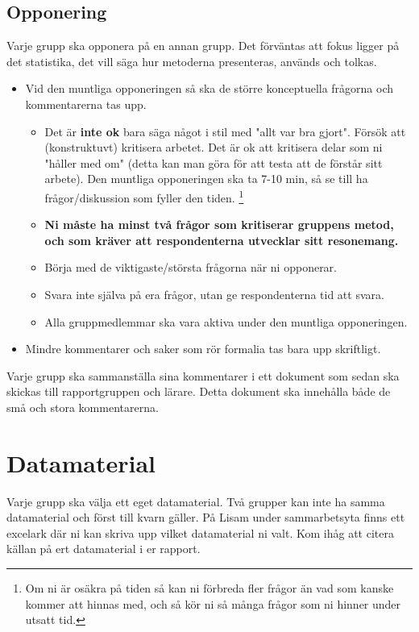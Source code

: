 \documentclass[a4paper]{article}
\begin{document}
\subsection*{Opponering}
Varje grupp ska opponera på en annan grupp. Det förväntas att fokus ligger på det statistika, det vill säga hur metoderna presenteras, används och tolkas.
\begin{itemize}
    \item Vid den muntliga opponeringen så ska de större konceptuella frågorna och kommentarerna tas upp.
    \begin{itemize}
      \item Det är \textbf{inte ok} bara säga något i stil med "allt var bra gjort". 
      Försök att (konstruktuvt) kritisera arbetet. Det är ok att kritisera delar som ni "håller med om" (detta kan man göra för att testa att de förstår sitt arbete).
      Den muntliga opponeringen ska ta 7-10 min, så se till ha frågor/diskussion som fyller den tiden.
      \footnote{Om ni är osäkra på tiden så kan ni förbreda fler frågor än vad som kanske
      kommer att hinnas med, och så kör ni så många frågor som ni hinner under utsatt tid.}
      \item \textbf{Ni måste ha minst två frågor som kritiserar gruppens metod, och som kräver att respondenterna utvecklar sitt resonemang.}
      \item Börja med de viktigaste/största frågorna när ni opponerar.
      \item Svara inte själva på era frågor, utan ge respondenterna tid att svara.
      \item Alla gruppmedlemmar ska vara aktiva under den muntliga opponeringen.
    \end{itemize}
    \item Mindre kommentarer och saker som rör formalia tas bara upp skriftligt.
\end{itemize}
Varje grupp ska sammanställa sina kommentarer i ett dokument som sedan ska skickas till rapportgruppen och lärare. Detta dokument ska innehålla både de små och stora kommentarerna.

\section{Datamaterial} \label{sec:data}
Varje grupp ska välja ett eget datamaterial. Två grupper kan inte ha samma datamaterial och först till kvarn gäller. På Lisam under sammarbetsyta finns ett excelark där ni kan skriva upp vilket datamaterial ni valt. Kom ihåg att citera källan på ert datamaterial i er rapport.
\end{document}
